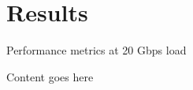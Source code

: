 \section{Results}


\begin{frame}[plain]{Performance metrics at 20 Gbps load}

	Content goes here
	
\end{frame}